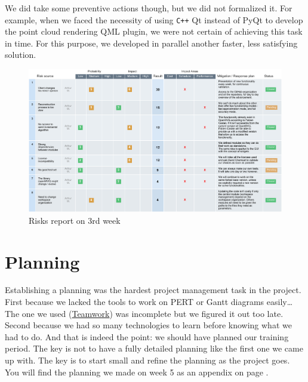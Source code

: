 We did take some preventive actions though, but we did not formalized
it. For example, when we faced the necessity of using \verb!C++! Qt instead
of PyQt to develop the point cloud rendering QML plugin, we were not
certain of achieving this task in time. For this purpose, we developed
in parallel another faster, less satisfying solution.


\begin{figure}[!htbp]
  \centering
  \includegraphics[width=\linewidth]{img/risks.pdf}
  \caption{Risks report on 3rd week}
  \label{fig:risks}
\end{figure}

\section{Planning}

Establishing a planning was the hardest project management task in the
project. First because we lacked the tools to work on PERT or Gantt
diagrams easily\ldots The one we used
(\href{https://www.teamwork.com/}{Teamwork}) was incomplete but we
figured it out too late. Second because we had so many technologies to
learn before knowing what we had to do. And that is indeed the point:
we should have planned our training period. The key is not to have a
fully detailed planning like the first one we came up with. The key is
to start small and refine the planning as the project goes. You will
find the planning we made on week 5 as an appendix on page
\pageref{app:planning}.
